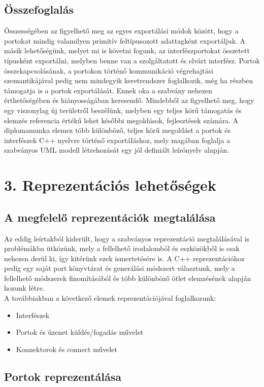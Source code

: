 \documentclass[a4paper,12pt]{report}
\begin{document}
\section{Összefoglalás}
Összességében az figyelhető meg az egyes exportálási módok között, hogy a portokat mindig valamilyen primitív feltípusozott adattagként exportáljuk. A másik lehetőségünk, melyet mi is követni fogunk, az interfészportokat összetett típusként exportálni, melyben benne van a szolgáltatott és elvárt interfész. Portok összekapcsolásának, a portokon történő kommunikáció végrehajtási szemantikájával pedig nem mindegyik keretrendszer foglalkozik, még ha részben támogatja is a portok exportálását. Ennek oka a szabvány nehezen érthetőségében és hiányosságában keresendő. Mindebből az figyelhető meg, hogy egy viszonylag új területről beszélünk, melyben egy teljes körű támogatás és elemzés referencia értékű lehet későbbi megoldások, fejlesztések számára. A diplomamunka elemez több különböző, teljes körű megoldást a portok és interfészek C++ nyelvre történő exportáláshoz, mely magában foglalja a szabványos UML modell létrehozását egy jól definiált leírónyelv alapján.

\chapter*{3. Reprezentációs lehetőségek} \label{reprezentation}
\section{A megfelelő reprezentációk megtalálása}
Az eddig leírtakból kiderült, hogy a szabványos reprezentáció megtalálásával is problémákba ütközünk, mely a fellelhető irodalomból és eszközökből is csak nehezen derül ki, így kitérünk ezek ismertetésére is. A C++ reprezentációhoz pedig egy saját port könyvtárat és generálási módszert választunk, mely a fellelhető módszerek finomításából és több különböző ötlet elemzésének alapján hozunk létre. \\

A továbbiakban a következő elemek reprezentációjával foglalkozunk:
\begin{itemize}
\item Interfészek
\item Portok és üzenet küldés/fogadás művelet
\item Konnektorok és connect művelet
\end{itemize}

\section{Portok reprezentálása}
\end{document}
